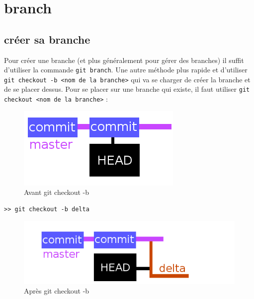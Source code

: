\documentclass[a4paper,10pt]{report}
\begin{document}
  \section{branch}
     \subsection{créer sa branche}
     Pour créer une branche (et plus généralement pour gérer des branches) il suffit d'utiliser la commande \verb|git branch|. Une autre méthode plus rapide et d'utiliser \verb|git checkout -b <nom de la branche>| qui va se charger de créer la branche et de se placer dessus. Pour se placer sur une branche qui existe, il faut utiliser \verb|git checkout <nom de la branche>| :
\begin{figure}[h!]
  \begin{center}
    \includegraphics[scale=0.3]{images/prebranch}
    \caption{Avant git checkout -b}
    \label{obprebranch}
  \end{center}
\end{figure}
\begin{verbatim}
>> git checkout -b delta
\end{verbatim}
\begin{figure}[h!]
  \begin{center}
    \includegraphics[scale=0.3]{images/afterbranch}
    \caption{Apr\`es git checkout -b}
    \label{obpostbranch}
  \end{center}
\end{figure}
\end{document}
